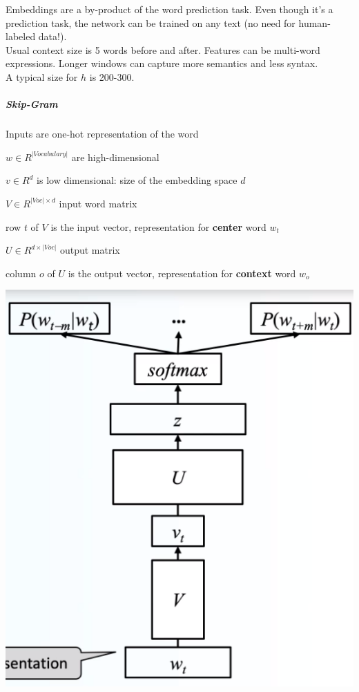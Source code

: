 \documentclass[10pt]{report}
\begin{document}
Embeddings are a by-product of the word prediction task. Even though it's a prediction task, the network can be trained on any text (no need for human-labeled data!).\\
Usual context size is 5 words before and after. Features can be multi-word expressions. Longer windows can capture more semantics and less syntax.\\
A typical size for $h$ is 200-300.
\pagebreak
\subparagraph{Skip-Gram}
\begin{multicols}{2}
\begin{list}{}{}
	\item Inputs are one-hot representation of the word
	\item $w\in R^{|Vocabulary|}$ are high-dimensional
	\item $v\in R^d$ is low dimensional: size of the embedding space $d$
	\item $V\in R^{|Voc|\times d}$ input word matrix
	\item row $t$ of $V$ is the input vector, representation for \textbf{center} word $w_t$
	\item $U\in R^{d\times|Voc|}$ output matrix
	\item column $o$ of $U$ is the output vector, representation for \textbf{context} word $w_o$
\end{list}
\columnbreak
\begin{center}
	\includegraphics[scale=0.35]{5.png}
\end{center}
\end{multicols}
\end{document}
